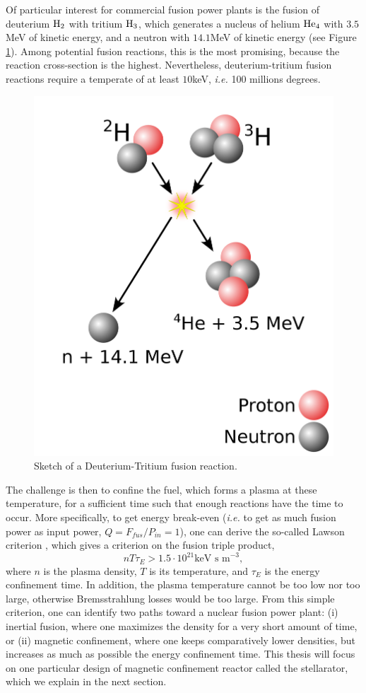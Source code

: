 \documentclass[my_thesis.tex]{subfiles}
\begin{document}
Of particular interest for commercial fusion power plants is the fusion of deuterium $\ce{H2}$ with tritium $\ce{H3}$, which generates a nucleus of helium $\ce{He4}$ with $3.5$MeV of kinetic energy, and a neutron with $14.1$MeV of kinetic energy (see Figure \ref{fig. dt fusion}). Among potential fusion reactions, this is the most promising, because the reaction cross-section is the highest. Nevertheless, deuterium-tritium fusion reactions require a temperate of at least $10$keV, \textit{i.e.} 100 millions degrees. 
\begin{figure}
    \centering
    \includegraphics[width=.5\linewidth]{images/introduction/DTFusion.png}
    \caption{Sketch of a Deuterium-Tritium fusion reaction.}
    \label{fig. dt fusion}
\end{figure}

The challenge is then to confine the fuel, which forms a plasma at these temperature, for a sufficient time such that enough reactions have the time to occur. More specifically, to get energy break-even (\textit{i.e.} to get as much fusion power as input power, $Q=F_{fus}/P_{in}=1$), one can derive the so-called Lawson criterion \citep{lawsonCriteriaPowerProducing1957}, which gives a criterion on the fusion triple product,
\begin{equation}
    nT\tau_E > 1.5\cdot 10^{21}\text{keV s m}^{-3}, 
\end{equation} 
where $n$ is the plasma density, $T$ is its temperature, and $\tau_E$ is the energy confinement time. In addition, the plasma temperature cannot be too low nor too large, otherwise Bremsstrahlung losses would be too large. From this simple criterion, one can identify two paths toward a nuclear fusion power plant: (i) inertial fusion, where one maximizes the density for a very short amount of time, or (ii) magnetic confinement, where one keeps comparatively lower densities, but increases as much as possible the energy confinement time. This thesis will focus on one particular design of magnetic confinement reactor called the stellarator, which we explain in the next section.
\end{document}

